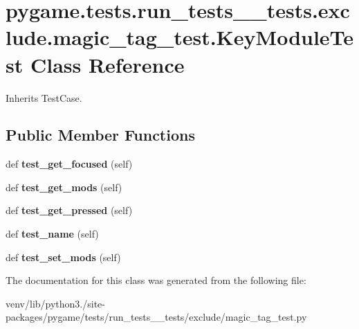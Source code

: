 \hypertarget{classpygame_1_1tests_1_1run__tests____tests_1_1exclude_1_1magic__tag__test_1_1_key_module_test}{}\section{pygame.\+tests.\+run\+\_\+tests\+\_\+\+\_\+tests.\+exclude.\+magic\+\_\+tag\+\_\+test.\+Key\+Module\+Test Class Reference}
\label{classpygame_1_1tests_1_1run__tests____tests_1_1exclude_1_1magic__tag__test_1_1_key_module_test}


Inherits Test\+Case.

\subsection*{Public Member Functions}
\begin{DoxyCompactItemize}
\item 
\mbox{\label{classpygame_1_1tests_1_1run__tests____tests_1_1exclude_1_1magic__tag__test_1_1_key_module_test_ab16019ba4b2170633af7e5c04a49d570}} 
def {\bfseries test\+\_\+get\+\_\+focused} (self)
\item 
\mbox{\label{classpygame_1_1tests_1_1run__tests____tests_1_1exclude_1_1magic__tag__test_1_1_key_module_test_a7f558cd51ef548a2f956eadd1a4f4df6}} 
def {\bfseries test\+\_\+get\+\_\+mods} (self)
\item 
\mbox{\label{classpygame_1_1tests_1_1run__tests____tests_1_1exclude_1_1magic__tag__test_1_1_key_module_test_a7d3e76b4337cc5bd84abdde3241bf205}} 
def {\bfseries test\+\_\+get\+\_\+pressed} (self)
\item 
\mbox{\label{classpygame_1_1tests_1_1run__tests____tests_1_1exclude_1_1magic__tag__test_1_1_key_module_test_a1ec29c956966a57d78edbdde180910be}} 
def {\bfseries test\+\_\+name} (self)
\item 
\mbox{\label{classpygame_1_1tests_1_1run__tests____tests_1_1exclude_1_1magic__tag__test_1_1_key_module_test_a363fde1e0fade241f11bc5d0ea7bf396}} 
def {\bfseries test\+\_\+set\+\_\+mods} (self)
\end{DoxyCompactItemize}


The documentation for this class was generated from the following file\+:\begin{DoxyCompactItemize}
\item 
venv/lib/python3./site-\/packages/pygame/tests/run\+\_\+tests\+\_\+\+\_\+tests/exclude/magic\+\_\+tag\+\_\+test.\+py\end{DoxyCompactItemize}
